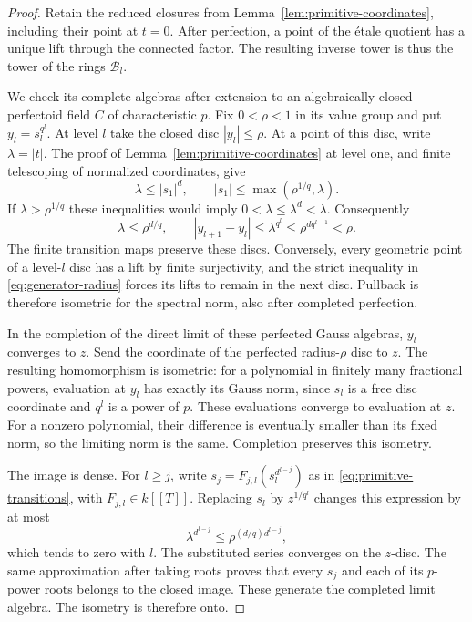\begin{proof}
Retain the reduced closures from
Lemma~\ref{lem:primitive-coordinates}, including their point at $t=0$.
After perfection, a point of the étale quotient has a unique lift
through the connected factor.  The resulting inverse tower is thus
the tower of the rings $\mathcal B_l$.

We check its complete algebras after extension to an algebraically
closed perfectoid field $C$ of characteristic $p$.  Fix
$0<\rho<1$ in its value group and put $y_l=s_l^{q^l}$.
At level $l$ take the closed disc $|y_l|\leq\rho$.
At a point of this disc, write $\lambda=|t|$.
The proof of Lemma~\ref{lem:primitive-coordinates} at level one,
and finite telescoping of normalized coordinates, give
\[
 \lambda\leq |s_1|^d,
 \qquad |s_1|\leq\max(\rho^{1/q},\lambda).
\]
If $\lambda>\rho^{1/q}$ these inequalities would imply
$0<\lambda\leq\lambda^d<\lambda$.  Consequently
\begin{equation}
 \lambda\leq\rho^{d/q},\qquad
 |y_{l+1}-y_l|\leq\lambda^{q^l}
                   \leq\rho^{d q^{l-1}}<\rho.
 \label{eq:generator-radius}
\end{equation}
The finite transition maps preserve these discs.  Conversely, every
geometric point of a level-$l$ disc has a lift by finite surjectivity,
and the strict inequality in \eqref{eq:generator-radius} forces its
lifts to remain in the next disc.  Pullback is therefore isometric
for the spectral norm, also after completed perfection.

In the completion of the direct limit of these perfected Gauss
algebras, $y_l$ converges to $z$.  Send the coordinate of the perfected
radius-$\rho$ disc to $z$.  The resulting homomorphism is isometric:
for a polynomial in finitely many fractional powers, evaluation at
$y_l$ has exactly its Gauss norm, since $s_l$ is a free disc
coordinate and $q^l$ is a power of $p$.  These evaluations converge
to evaluation at $z$.  For a nonzero polynomial, their difference
is eventually smaller than its fixed norm, so the limiting norm is
the same.  Completion preserves this isometry.

The image is dense.  For $l\geq j$, write
$s_j=F_{j,l}(s_l^{d^{l-j}})$ as in
\eqref{eq:primitive-transitions}, with $F_{j,l}\in k[[T]]$.
Replacing $s_l$ by $z^{1/q^l}$ changes this expression by at most
\[
 \lambda^{d^{l-j}}\leq\rho^{(d/q)d^{l-j}},
\]
which tends to zero with $l$.  The substituted series converges on
the $z$-disc.  The same approximation after taking roots proves
that every $s_j$ and each of its $p$-power roots belongs to the
closed image.  These generate the completed limit algebra.
The isometry is therefore onto.


\end{proof}
